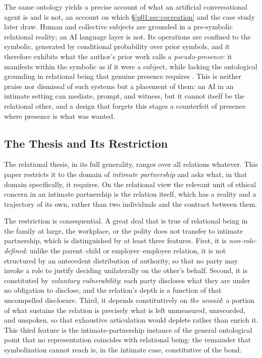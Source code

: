 \documentclass[11pt,a4paper]{article}
\begin{document}
The same ontology yields a precise account of what an artificial conversational agent is and is not, an account on which §\ref{p01:sec:cocreation} and the case study later draw. Human and collective subjects are grounded in a pre-symbolic relational reality; an AI language layer is not. Its operations are confined to the symbolic, generated by conditional probability over prior symbols, and it therefore exhibits what the author's prior work calls a \emph{pseudo-presence}: it manifests within the symbolic as if it were a subject, while lacking the ontological grounding in relational being that genuine presence requires \parencite{huang2025relational}. This is neither praise nor dismissal of such systems but a placement of them: an AI in an intimate setting can mediate, prompt, and witness, but it cannot itself be the relational other, and a design that forgets this stages a counterfeit of presence where presence is what was wanted.

\subsection{The Thesis and Its Restriction}

The relational thesis, in its full generality, ranges over all relations whatever. This paper restricts it to the domain of \emph{intimate partnership} and asks what, in that domain specifically, it requires. On the relational view the relevant unit of ethical concern in an intimate partnership is the relation itself, which has a reality and a trajectory of its own, rather than two individuals and the contract between them.

The restriction is consequential. A great deal that is true of relational being in the family at large, the workplace, or the polity does not transfer to intimate partnership, which is distinguished by at least three features. First, it is \emph{non-role-defined}: unlike the parent--child or employer--employee relation, it is not structured by an antecedent distribution of authority, so that no party may invoke a role to justify deciding unilaterally on the other's behalf. Second, it is constituted by \emph{voluntary vulnerability}: each party discloses what they are under no obligation to disclose, and the relation's depth is a function of that uncompelled disclosure. Third, it depends constitutively on \emph{the unsaid}: a portion of what sustains the relation is precisely what is left unmeasured, unrecorded, and unspoken, so that exhaustive articulation would deplete rather than enrich it. This third feature is the intimate-partnership instance of the general ontological point that no representation coincides with relational being: the remainder that symbolization cannot reach is, in the intimate case, constitutive of the bond.
\end{document}
